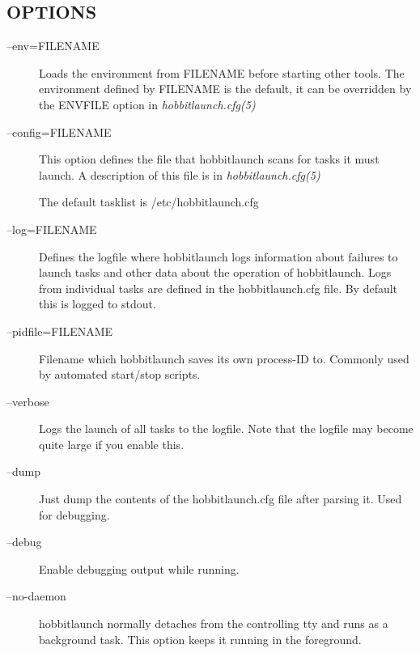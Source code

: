 \subsection{OPTIONS}
\begin{description}
\item[--env=FILENAME] Loads the environment from FILENAME before
  starting other tools. The environment defined by FILENAME is the
  default, it can be overridden by the ENVFILE option in
  \emph{hobbitlaunch.cfg(5)}



 

\item[--config=FILENAME] This option defines the file that
  hobbitlaunch scans for tasks it must launch. A description of this
  file is in \emph{hobbitlaunch.cfg(5)}

 The default tasklist is /etc/hobbitlaunch.cfg 

 

\item[--log=FILENAME] Defines the logfile where hobbitlaunch logs
  information about failures to launch tasks and other data about the
  operation of hobbitlaunch. Logs from individual tasks are defined in
  the hobbitlaunch.cfg file. By default this is logged to stdout. 


 

\item[--pidfile=FILENAME] Filename which hobbitlaunch saves its own process-ID to. Commonly used by automated start/stop scripts. 

 

\item[--verbose] Logs the launch of all tasks to the logfile. Note that the logfile may become quite large if you enable this. 

 

\item[--dump] Just dump the contents of the hobbitlaunch.cfg file after parsing it. Used for debugging. 

 

\item[--debug] Enable debugging output while running. 

 

\item[--no-daemon] hobbitlaunch normally detaches from the controlling
  tty and runs as a background task. This option keeps it running in
  the foreground. 


 

\end{description}
